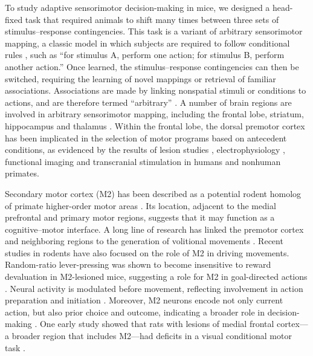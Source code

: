 To study adaptive sensorimotor decision-making in mice, we designed a head-fixed task that required animals to shift many times between three sets of stimulus–response contingencies. This task is a variant of arbitrary sensorimotor mapping, a classic model in which subjects are required to follow conditional rules \citep{bunge2005neural,white1999rule}, such as “for stimulus A, perform one action; for stimulus B, perform another action.” Once learned, the stimulus–response contingencies can then be switched, requiring the learning of novel mappings or retrieval of familiar associations. Associations are made by linking nonspatial stimuli or conditions to actions, and are therefore termed “arbitrary” \citep{wise2000arbitrary}. A number of brain regions are involved in arbitrary sensorimotor mapping, including the frontal lobe, striatum, hippocampus and thalamus \citep{wise2000arbitrary}. Within the frontal lobe, the dorsal premotor cortex has been implicated in the selection of motor programs based on antecedent conditions, as evidenced by the results of lesion studies \citep{petrides1985deficits,halsband1985premotor,nixon2004cortico}, electrophysiology \citep{mitz1991learning,chen1995neuronal}, functional imaging \citep{toni2001learning,boettiger2005frontal} and transcranial stimulation \citep{rushworth2002role} in humans and nonhuman primates.

Secondary motor cortex (M2) has been described as a potential rodent homolog of primate higher-order motor areas \citep{murray2000role,preuss1995rats}. Its location, adjacent to the medial prefrontal and primary motor regions, suggests that it may function as a cognitive–motor interface. A long line of research has linked the premotor cortex and neighboring regions to the generation of volitional movements \citep{nachev2008functional,schall2002monitoring,isoda2007switching}. Recent studies in rodents have also focused on the role of M2 in driving movements. Random-ratio lever-pressing was shown to become insensitive to reward devaluation in M2-lesioned mice, suggesting a role for M2 in goal-directed actions \citep{gremel2013premotor}. Neural activity is modulated before movement, reflecting involvement in action preparation and initiation \citep{sul2011role,erlich2011cortical,murakami2014neural}. Moreover, M2 neurons encode not only current action, but also prior choice and outcome, indicating a broader role in decision-making \citep{sul2011role}. One early study showed that rats with lesions of medial frontal cortex—a broader region that includes M2—had deficits in a visual conditional motor task \citep{passingham1988premotor}.

